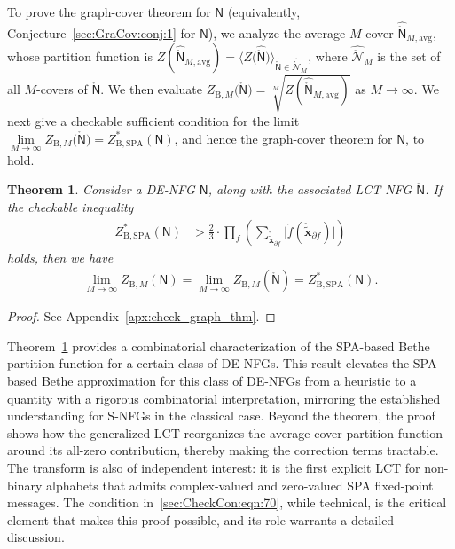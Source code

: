 \documentclass[journal]{IEEEtran}
\newcommand{\add}[1]{{\color{black}#1}}
\newtheorem{theorem}{Theorem}
\newcommand{\vect}[1]{ \bm{#1} }
\newcommand{\set}[1]{\mathcal{#1}}
\newcommand{\sfN}{ \mathsf{N} }
\newcommand{\setpf}{ \partial f }
\newcommand{\graphN}{ \mathsf{N} }
\newcommand{\ZBSPA}{ Z_{\mathrm{B,SPA}} }
\newcommand{\ZBM}{ Z_{\mathrm{B},M} }
\newcommand{\LCTtv}[1]{ \mathring{ \tilde{ \vect{#1} } } }
\newcommand{\LCT}[1]{ \mathring{#1} }
\newcommand{\hLCT}[1]{ \hat{ \LCT{#1} } }
\newcommand{\hLCTgraphN}{ \hLCT{\graphN} }
\begin{document}
\add{To prove the graph-cover theorem for $\sfN$ (equivalently, Conjecture~\ref{sec:GraCov:conj:1} for $\sfN$), we analyze the average $M$-cover $ \hat{\LCT{\graphN}}_{M,\mathrm{avg}} $, whose partition function is}
$ Z(\hat{\LCT{\graphN}}_{M,\mathrm{avg}}) =  \bigl\langle
  Z\bigl( \hLCTgraphN \bigr)
  \bigr\rangle_{ \hLCTgraphN \in \hLCT{\set{N}}_{M} } $, where $\hLCT{\set{N}}_{M}$ is the set of all $M$-covers of $ \LCT{\graphN} $. We then evaluate
$ \ZBM\bigl( \LCT{\graphN} \bigr) = \sqrt[M]{ Z(\hat{\LCT{\graphN}}_{M,\mathrm{avg}}) } $ as $ M \to \infty $.
\add{We next give a checkable sufficient condition for the limit $ \lim\limits_{M \to \infty} \ZBM\bigl( \LCT{\graphN} \bigr) = \ZBSPA^{*}(\graphN)$, and hence the graph-cover theorem for $\sfN$, to hold.}
\begin{theorem}\label{sec:CheckCon:thm:1}
  Consider a DE-NFG $ \graphN $, along with the associated LCT NFG $ \LCT{\graphN} $. If
  the checkable inequality
  \begin{align}
    \ZBSPA^{*}(\graphN)
     & >
    \frac{2}{3}
    \cdot
    \prod_{f}
    \left(
    \sum_{\LCTtv{x}_{\setpf}}
    \bigl| \LCT{f}( \LCTtv{x}_{\setpf} ) \bigr|
    \right)
    \label{sec:CheckCon:eqn:70}
  \end{align}
  holds,
  then we have
  \begin{align*}
    \lim_{M \to \infty}
    \ZBM(\graphN)
    = \lim_{M \to \infty}
    \ZBM(\LCT{\graphN})
    = \ZBSPA^{*}(\graphN).
  \end{align*}
\end{theorem}
\begin{proof}
  See Appendix~\ref{apx:check_graph_thm}.
\end{proof}

Theorem~\ref{sec:CheckCon:thm:1} provides a combinatorial characterization of the SPA-based Bethe partition function for a certain class of DE-NFGs. This result elevates the SPA-based Bethe approximation for this class of DE-NFGs from a heuristic to a quantity with a rigorous combinatorial interpretation, mirroring the established understanding for S-NFGs in the classical case. \add{Beyond the theorem, the proof shows how the generalized LCT reorganizes the average-cover partition function around its all-zero contribution, thereby making the correction terms tractable. The transform is also of independent interest: it is the first explicit LCT for non-binary alphabets that admits complex-valued and zero-valued SPA fixed-point messages.} The condition in~\eqref{sec:CheckCon:eqn:70}, while technical, is the critical element that makes this proof possible, and its role warrants a detailed discussion.
\end{document}
